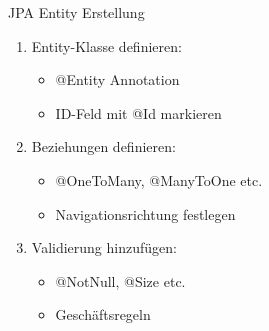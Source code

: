 \begin{KR}{JPA Entity Erstellung}
\begin{enumerate}
    \item Entity-Klasse definieren:
    \begin{itemize}
        \item @Entity Annotation
        \item ID-Feld mit @Id markieren
    \end{itemize}
    \item Beziehungen definieren:
    \begin{itemize}
        \item @OneToMany, @ManyToOne etc.
        \item Navigationsrichtung festlegen
    \end{itemize}
    \item Validierung hinzufügen:
    \begin{itemize}
        \item @NotNull, @Size etc.
        \item Geschäftsregeln
    \end{itemize}
\end{enumerate}
\end{KR}

